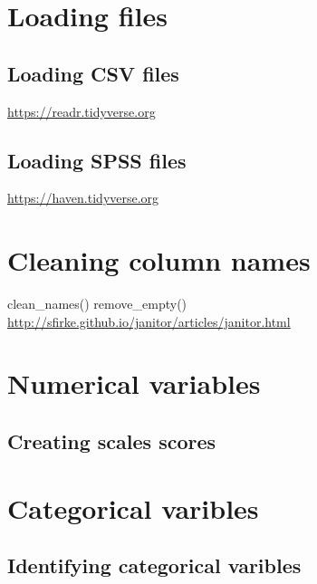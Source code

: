 \documentclass[
]{krantz}
\begin{document}
\hypertarget{loading-files}{%
\section{Loading files}\label{loading-files}}

\hypertarget{loading-csv-files}{%
\subsection{Loading CSV files}\label{loading-csv-files}}

\url{https://readr.tidyverse.org}

\hypertarget{loading-spss-files}{%
\subsection{Loading SPSS files}\label{loading-spss-files}}

\url{https://haven.tidyverse.org}

\hypertarget{cleaning-column-names}{%
\section{Cleaning column names}\label{cleaning-column-names}}

clean\_names()
remove\_empty()
\url{http://sfirke.github.io/janitor/articles/janitor.html}

\hypertarget{numerical-variables}{%
\section{Numerical variables}\label{numerical-variables}}

\hypertarget{creating-scales-scores}{%
\subsection{Creating scales scores}\label{creating-scales-scores}}

\hypertarget{categorical-varibles}{%
\section{Categorical varibles}\label{categorical-varibles}}

\hypertarget{identifying-categorical-varibles}{%
\subsection{Identifying categorical varibles}\label{identifying-categorical-varibles}}
\end{document}
